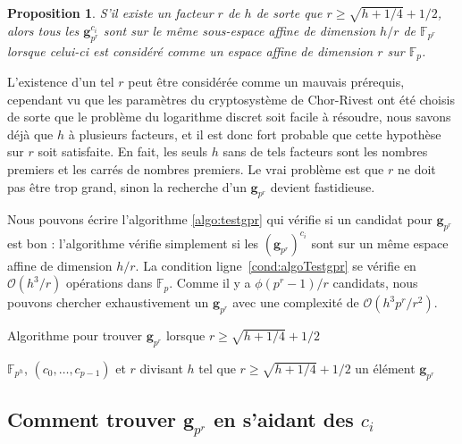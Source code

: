 \documentclass[a4paper, titlepage, 11pt]{article}
\newtheorem{prop}[theo]{Proposition}
\theoremstyle{definition}
\theoremstyle{remark}
\def\O{\mathcal O}
\def\gf #1{\mathbb{F}_{#1}}
\def\mbf #1{\mathbf{#1}}
\begin{document}
\begin{prop}
S'il existe un facteur $r$ de $h$ de sorte que $r \geqslant \sqrt{h + 1/4} + 1/2$, alors tous les $\mbf g_{p^r}^{c_i}$ sont sur le même sous-espace affine de dimension $h/r$ de $\gf{p^r}$ lorsque celui-ci est considéré comme un espace affine de dimension $r$ sur $\gf{p}$.
\end{prop}

L'existence d'un tel $r$ peut être considérée comme un mauvais prérequis, cependant vu que les paramètres du cryptosystème de Chor-Rivest ont été choisis de sorte que le problème du logarithme discret soit facile à résoudre, nous savons déjà que $h$ à plusieurs facteurs, et il est donc fort probable que cette hypothèse sur $r$ soit satisfaite. En fait, les seuls $h$ sans de tels facteurs sont les nombres premiers et les carrés de nombres premiers. Le vrai problème est que $r$ ne doit pas être trop grand, sinon la recherche d'un $\mbf g_{p^r}$  devient fastidieuse.

Nous pouvons écrire l'algorithme \ref{algo:testgpr} qui vérifie si un candidat pour $\mbf g_{p^r}$ est bon : l'algorithme vérifie simplement si les $(\mbf g_{p^r})^{c_i}$ sont sur un même espace affine de dimension $h/r$. La condition ligne~\ref{cond:algoTestgpr} se vérifie en $\O(h^3/r)$ opérations dans $\gf{p}$. Comme il y a $\phi(p^r-1)/r$ candidats, nous pouvons chercher exhaustivement un $\mbf g_{p^r}$ avec une complexité de $\O(h^3p^r/r^2)$.

\begin{algorithm}[h]
\caption{Algorithme pour trouver $\mbf g_{p^r}$ lorsque $r\geqslant \sqrt{h + 1/4} + 1/2$}
\label{algo:testgpr}
\begin{algorithmic}[1]
\REQUIRE $\gf{p^h}$, $(c_0,\dots, c_{p-1})$ et $r$ divisant $h$ tel que $r\geqslant \sqrt{h + 1/4} + 1/2$
\ENSURE un élément $\mbf g_{p^r}$
\FORALL{$\zeta \in \gf{p^h}$ générateur de $\gf{p^r}^\times$} \label{boucle:algoTestgpr}
		\label{cond:algoTestgpr}
		\ENDIF
	\ENDFOR
	\RETURN{$\zeta$}
\ENDFOR
\end{algorithmic}
\end{algorithm}

\subsection{Comment trouver $\mbf g_{p^r}$ en s'aidant des $c_i$}
\end{document}
